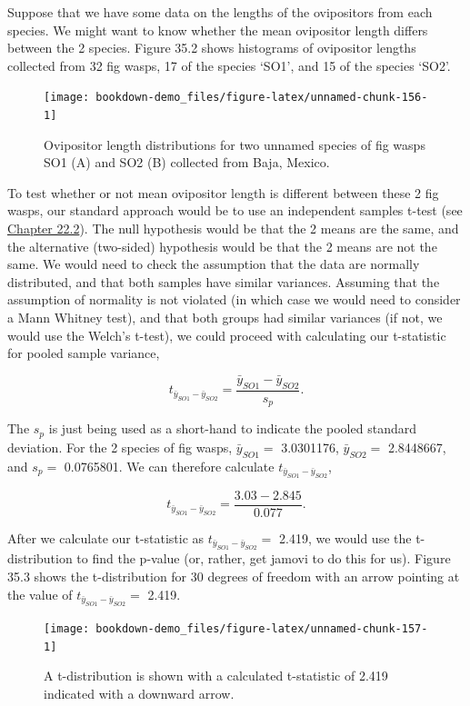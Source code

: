 \documentclass[
  openany]{krantz}
\begin{document}
Suppose that we have some data on the lengths of the ovipositors from each species.
We might want to know whether the mean ovipositor length differs between the 2 species. Figure 35.2 shows histograms of ovipositor lengths collected from 32 fig wasps, 17 of the species `SO1', and 15 of the species `SO2'.

\begin{figure}
\texttt{[image: bookdown-demo\_files/figure-latex/unnamed-chunk-156-1]} \caption{Ovipositor length distributions for two unnamed species of fig wasps SO1 (A) and SO2 (B) collected from Baja, Mexico.}\label{fig:unnamed-chunk-156}
\end{figure}

To test whether or not mean ovipositor length is different between these 2 fig wasps, our standard approach would be to use an independent samples t-test (see \protect\hyperlink{independent-samples-t-test}{Chapter 22.2}).
The null hypothesis would be that the 2 means are the same, and the alternative (two-sided) hypothesis would be that the 2 means are not the same.
We would need to check the assumption that the data are normally distributed, and that both samples have similar variances.
Assuming that the assumption of normality is not violated (in which case we would need to consider a Mann Whitney test), and that both groups had similar variances (if not, we would use the Welch's t-test), we could proceed with calculating our t-statistic for pooled sample variance,

\[t_{\bar{y}_{SO1} - \bar{y}_{SO2}} = \frac{\bar{y}_{SO1} - \bar{y}_{SO2}}{s_{p}}.\]

The \(s_{p}\) is just being used as a short-hand to indicate the pooled standard deviation.
For the 2 species of fig wasps, \(\bar{y}_{SO1} =\) 3.0301176, \(\bar{y}_{SO2} =\) 2.8448667, and \(s_{p} =\) 0.0765801.
We can therefore calculate \(t_{\bar{y}_{SO1} - \bar{y}_{SO2}}\),

\[t_{\bar{y}_{SO1} - \bar{y}_{SO2}} = \frac{3.03 - 2.845}{0.077}.\]

After we calculate our t-statistic as \(t_{\bar{y}_{SO1} - \bar{y}_{SO2}} =\) 2.419, we would use the t-distribution to find the p-value (or, rather, get jamovi to do this for us).
Figure 35.3 shows the t-distribution for 30 degrees of freedom with an arrow pointing at the value of \(t_{\bar{y}_{SO1} - \bar{y}_{SO2}} =\) 2.419.

\begin{figure}
\texttt{[image: bookdown-demo\_files/figure-latex/unnamed-chunk-157-1]} \caption{A t-distribution is shown with a calculated t-statistic of 2.419 indicated with a downward arrow.}\label{fig:unnamed-chunk-157}
\end{figure}
\end{document}
